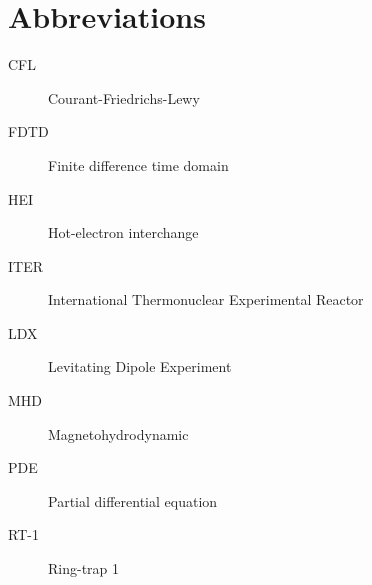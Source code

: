 \section*{Abbreviations}
\begin{description}
    \item[CFL] Courant-Friedrichs-Lewy
    \item[FDTD] Finite difference time domain
    \item[HEI] Hot-electron interchange 
    \item[ITER] International Thermonuclear Experimental Reactor
    \item[LDX] Levitating Dipole Experiment
    \item[MHD] Magnetohydrodynamic 
    \item[PDE] Partial differential equation
    \item[RT-1] Ring-trap 1 
\end{description}